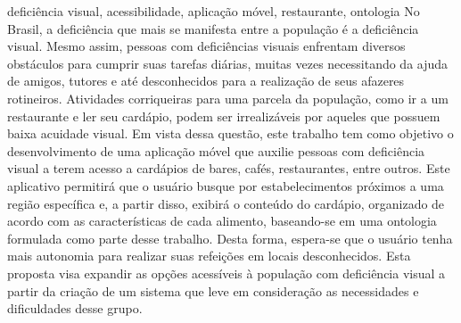 \documentclass[portuguese,oneside]{tcc}
\begin{document}
		\begin{resumo}{deficiência visual, acessibilidade, aplicação móvel, restaurante, ontologia}
			No Brasil, a deficiência que mais se manifesta entre a população é a deficiência visual. Mesmo assim, pessoas com deficiências visuais enfrentam diversos obstáculos para cumprir suas tarefas diárias, muitas vezes necessitando da ajuda de amigos, tutores e até desconhecidos para a realização de seus afazeres rotineiros. Atividades corriqueiras para uma parcela da população, como ir a um restaurante e ler seu cardápio, podem ser irrealizáveis por aqueles que possuem baixa acuidade visual. Em vista dessa questão, este trabalho tem como objetivo o desenvolvimento de uma aplicação móvel que auxilie pessoas com deficiência visual a terem acesso a cardápios de bares, cafés, restaurantes, entre outros. Este aplicativo permitirá que o usuário busque por estabelecimentos próximos a uma região específica e, a partir disso, exibirá o conteúdo do cardápio, organizado de acordo com as características de cada alimento, baseando-se em uma ontologia formulada como parte desse trabalho. Desta forma, espera-se que o usuário tenha mais autonomia para realizar suas refeições em locais desconhecidos. Esta proposta visa expandir as opções acessíveis à população com deficiência visual a partir da criação de um sistema que leve em consideração as necessidades e dificuldades desse grupo.
		\end{resumo}
		
\end{document}
